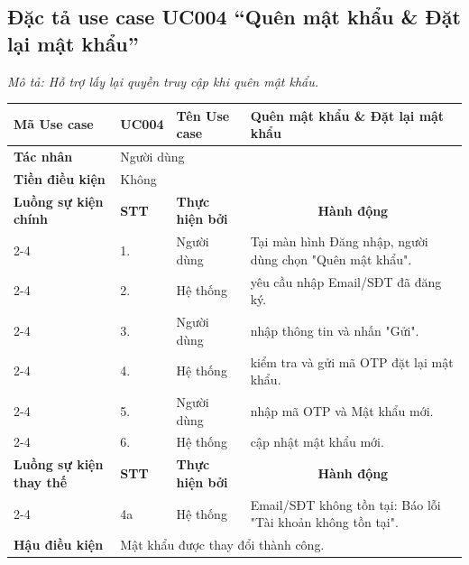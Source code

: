 \documentclass[../main.tex]{subfiles}
\begin{document}
\subsection{Đặc tả use case UC004 ``Quên mật khẩu \& Đặt lại mật khẩu''}
\textit{Mô tả: Hỗ trợ lấy lại quyền truy cập khi quên mật khẩu.}
\vspace{0.5cm}

\begingroup
\renewcommand{\arraystretch}{1.5}

\begin{longtable}{|p{2.7cm}|p{0.8cm}|p{2.6cm}|p{7.3cm}|}
\hline
\cellcolor[HTML]{D5F5E3}\textbf{Mã Use case} & \multicolumn{1}{l|}{UC004} & \cellcolor[HTML]{D5F5E3}\textbf{Tên Use case} & Quên mật khẩu \& Đặt lại mật khẩu \\ \hline
\cellcolor[HTML]{D5F5E3}\textbf{Tác nhân} & \multicolumn{3}{p{10.7cm}|}{Người dùng} \\ \hline
\cellcolor[HTML]{D5F5E3}\textbf{Tiền điều kiện} & \multicolumn{3}{p{10.7cm}|}{Không} \\ \hline

\cellcolor[HTML]{D5F5E3}\textbf{Luồng sự kiện chính} & \cellcolor[HTML]{FDEBD0}\textbf{STT} & \cellcolor[HTML]{FDEBD0}\textbf{Thực hiện bởi} & \multicolumn{1}{c|}{\cellcolor[HTML]{FDEBD0}\textbf{Hành động}} \\ \cline{2-4} 
\cellcolor[HTML]{D5F5E3} & 1. & Người dùng & Tại màn hình Đăng nhập, người dùng chọn "Quên mật khẩu". \\ \cline{2-4} 
\cellcolor[HTML]{D5F5E3} & 2. & Hệ thống & yêu cầu nhập Email/SĐT đã đăng ký. \\ \cline{2-4} 
\cellcolor[HTML]{D5F5E3} & 3. & Người dùng & nhập thông tin và nhấn "Gửi". \\ \cline{2-4} 
\cellcolor[HTML]{D5F5E3} & 4. & Hệ thống & kiểm tra và gửi mã OTP đặt lại mật khẩu. \\ \cline{2-4} 
\cellcolor[HTML]{D5F5E3} & 5. & Người dùng & nhập mã OTP và Mật khẩu mới. \\ \cline{2-4} 
\cellcolor[HTML]{D5F5E3} & 6. & Hệ thống & cập nhật mật khẩu mới. \\ \hline

\cellcolor[HTML]{D5F5E3}\textbf{Luồng sự kiện thay thế} & \cellcolor[HTML]{FDEBD0}\textbf{STT} & \cellcolor[HTML]{FDEBD0}\textbf{Thực hiện bởi} & \multicolumn{1}{c|}{\cellcolor[HTML]{FDEBD0}\textbf{Hành động}} \\ \cline{2-4} 
\cellcolor[HTML]{D5F5E3} & 4a & Hệ thống & Email/SĐT không tồn tại: Báo lỗi "Tài khoản không tồn tại". \\ \hline

\cellcolor[HTML]{D5F5E3}\textbf{Hậu điều kiện} & \multicolumn{3}{p{10.7cm}|}{Mật khẩu được thay đổi thành công.} \\ \hline
\end{longtable}
\endgroup
\end{document}
